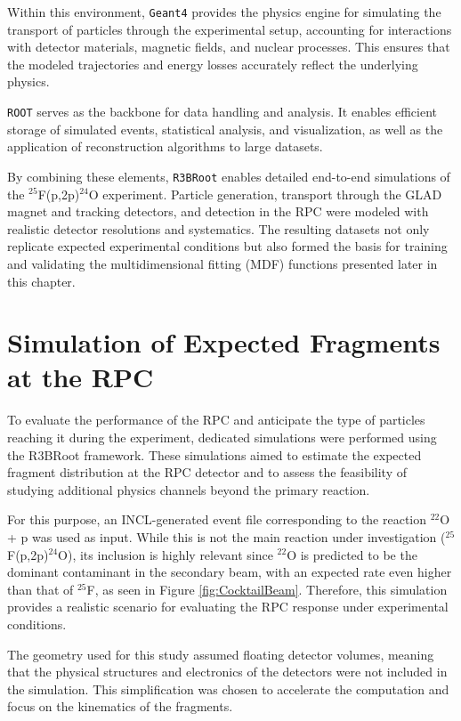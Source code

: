 Within this environment, \texttt{Geant4} provides the physics engine for simulating the transport of particles through the experimental setup, accounting for interactions with detector materials, magnetic fields, and nuclear processes. This ensures that the modeled trajectories and energy losses accurately reflect the underlying physics.  

\texttt{ROOT} serves as the backbone for data handling and analysis. It enables efficient storage of simulated events, statistical analysis, and visualization, as well as the application of reconstruction algorithms to large datasets.  

By combining these elements, \texttt{R3BRoot} enables detailed end-to-end simulations of the $^{25}$F(p,2p)$^{24}$O experiment. Particle generation, transport through the GLAD magnet and tracking detectors, and detection in the RPC were modeled with realistic detector resolutions and systematics. The resulting datasets not only replicate expected experimental conditions but also formed the basis for training and validating the multidimensional fitting (MDF) functions presented later in this chapter.  
 


\section{Simulation of Expected Fragments at the RPC}

To evaluate the performance of the \gls{RPC} and anticipate the type of particles reaching it during the experiment, dedicated simulations were performed using the R3BRoot framework. These simulations aimed to estimate the expected fragment distribution at the \gls{RPC} detector and to assess the feasibility of studying additional physics channels beyond the primary reaction.

For this purpose, an INCL-generated event file corresponding to the reaction $^{22}$O + p was used as input. While this is not the main reaction under investigation ($^{25}$F(p,2p)$^{24}$O), its inclusion is highly relevant since $^{22}$O is predicted to be the dominant contaminant in the secondary beam, with an expected rate even higher than that of $^{25}$F, as seen in Figure \ref{fig:CocktailBeam}. Therefore, this simulation provides a realistic scenario for evaluating the \gls{RPC} response under experimental conditions.

The geometry used for this study assumed floating detector volumes, meaning that the physical structures and electronics of the detectors were not included in the simulation. This simplification was chosen to accelerate the computation and focus on the kinematics of the fragments.

